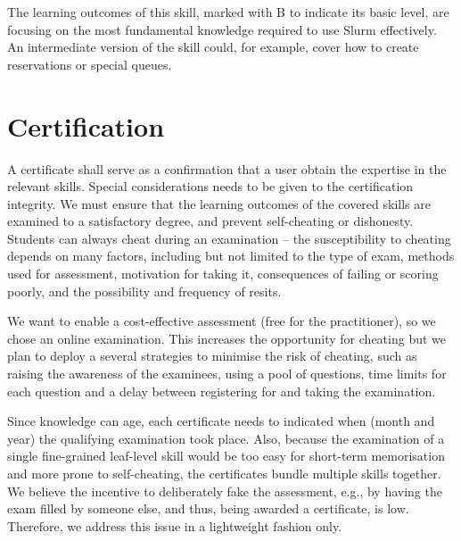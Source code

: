 \documentclass[jocse]{jocseart}
\begin{document}
The learning outcomes of this skill, marked with B to indicate its basic level, are focusing on the most fundamental knowledge required to use Slurm effectively.
An intermediate version of the skill could, for example, cover how to create reservations or special queues.  



\section{Certification}
\label{sec:certification}

A certificate shall serve as a confirmation that a user obtain the expertise in the relevant skills.
Special considerations needs to be given to the certification integrity.  
We must ensure that the learning outcomes of the covered skills are examined to a satisfactory degree, and prevent self-cheating or dishonesty.
Students can always cheat during an examination -- the susceptibility to cheating depends on many factors, including but not limited to the type of exam, methods used for assessment, motivation for taking it,  consequences of failing or scoring poorly, and the possibility and frequency of resits. 

We want to enable a cost-effective assessment (free for the practitioner), so we chose an online examination.
This increases the opportunity for cheating \cite{rowe2004cheating} but we plan to deploy a several strategies to minimise the risk of cheating, such as raising the awareness of the examinees, using a pool of questions, time limits for each question and a delay between registering for and taking the examination. 

Since knowledge can age, each certificate needs to indicated when (month and year) the qualifying examination took place.
Also, because the examination of a single fine-grained leaf-level skill would be too easy for short-term memorisation and more prone to self-cheating, the certificates bundle multiple skills together.
We believe the incentive to deliberately fake the assessment, e.g., by having the exam filled by someone else, and thus, being awarded a certificate, is low.
Therefore, we address this issue in a lightweight fashion only.
\end{document}
